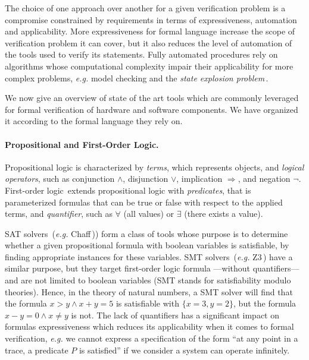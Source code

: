 The choice of one approach over another for a given verification problem is a
compromise constrained by requirements in terms of expressiveness, automation
and applicability.
%
More expressiveness for formal language increase the scope of verification
problem it can cover, but it also reduces the level of automation of the tools
used to verify its statements.
%
Fully automated procedures rely on algorithms whose computational complexity
impair their applicability for more complex problems, \emph{e.g.}  model
checking and the \emph{state explosion problem}\,\cite{clarke2012model}.

We now give an overview of state of the art tools which are commonly leveraged
for formal verification of hardware and software components.
%
We have organized it according to the formal language they rely on.

\paragraph{Propositional and First-Order Logic.}
%
Propositional logic is characterized by \emph{terms}, which represents objects,
and \emph{logical operators}, such as conjunction \( \wedge \), disjunction
\( \vee \), implication \( \Rightarrow \), and negation \( \neg \).
%
First-order logic\,\cite{smullyan2012fol} extends propositional logic with
\emph{predicates}, that is parameterized formulas that can be true or false with
respect to the applied terms, and \emph{quantifier}, such as \( \forall \) (all
values) or \( \exists \) (there exists a value).

SAT solvers\,\cite{malik2009boolean} (\emph{e.g.}
Chaff\,\cite{moskewicz2001chaff})) form a class of tools whose purpose is to
determine whether a given propositional formula with boolean variables is
satisfiable, by finding appropriate instances for these variables.
%
SMT solvers\,\cite{barrett20136years} (\emph{e.g.} Z3\,\cite{de2008z3}) have a
similar purpose, but they target first-order logic formula ---without
quantifiers--- and are not limited to boolean variables (SMT stands for
satisfiability modulo theories).
%
Hence, in the theory of natural numbers, a SMT solver will find that the formula
\( x > y \wedge x + y = 5 \) is satisfiable with \( \{ x = 3, y = 2 \} \), but
the formula \( x - y = 0 \wedge x \neq y \) is not.
%
The lack of quantifiers has a significant impact on formulas expressiveness
which reduces its applicability when it comes to formal verification,
\emph{e.g.} we cannot express a specification of the form ``at any point in a
trace, a predicate \( P \) is satisfied'' if we consider a system can operate
infinitely.

